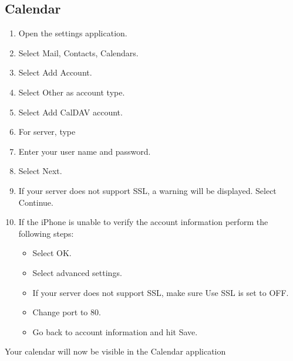 \documentclass[letterpaper,10pt,english]{sphinxmanual}
\begin{document}
\subsection{Calendar}
\label{pim/sync_ios:calendar}\begin{enumerate}
\item {} 
Open the settings application.

\item {} 
Select Mail, Contacts, Calendars.

\item {} 
Select Add Account.

\item {} 
Select Other as account type.

\item {} 
Select Add CalDAV account.

\item {} 
For server, type 

\item {} 
Enter your user name and password.

\item {} 
Select Next.

\item {} 
If your server does not support SSL, a warning will be displayed.
Select Continue.

\item {} 
If the iPhone is unable to verify the account information perform the
following steps:
\begin{itemize}
\item {} 
Select OK.

\item {} 
Select advanced settings.

\item {} 
If your server does not support SSL, make sure Use SSL is set to OFF.

\item {} 
Change port to 80.

\item {} 
Go back to account information and hit Save.

\end{itemize}

\end{enumerate}

Your calendar will now be visible in the Calendar application
\end{document}
